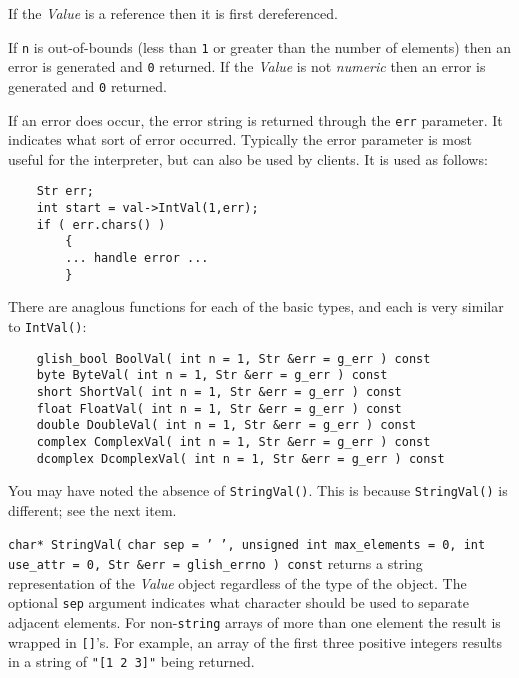 \begin{sloppy}
\begin{list}{}{}
If the {\em Value} is a reference then it is first dereferenced.

If {\tt n} is out-of-bounds
(less than {\tt 1} or greater than the number of elements) then an
error is generated and {\tt 0} returned. 
If the {\em Value} is
not {\em numeric} then an error is generated and {\tt 0} returned.

If an error does occur, the error string is returned through the {\tt err}
parameter. It indicates what sort of error occurred. Typically the error parameter
is most useful for the interpreter, but can also be used by
clients. It is  used as follows:
\begin{verbatim}
    Str err;
    int start = val->IntVal(1,err);
    if ( err.chars() )
        {
        ... handle error ...
        }
\end{verbatim}

There are anaglous functions for each of the basic types, and each
is very similar to {\tt IntVal()}:
\begin{verbatim}
    glish_bool BoolVal( int n = 1, Str &err = g_err ) const
    byte ByteVal( int n = 1, Str &err = g_err ) const
    short ShortVal( int n = 1, Str &err = g_err ) const
    float FloatVal( int n = 1, Str &err = g_err ) const
    double DoubleVal( int n = 1, Str &err = g_err ) const
    complex ComplexVal( int n = 1, Str &err = g_err ) const
    dcomplex DcomplexVal( int n = 1, Str &err = g_err ) const
\end{verbatim}
You may have noted the absence of {\tt StringVal()}. This is because
{\tt StringVal()} is different; see the next item.

\item[{\tt char* StringVal(}] {\tt char sep = ' ', unsigned int max\_elements = 0, 
int use\_attr = 0, Str \&err = glish\_errno ) const}
returns a string representation of the {\em Value} object regardless of
the type of the object.  The optional {\tt sep} argument indicates what character
should be used to separate adjacent elements. For non-{\tt string} arrays of more
than one element the result is wrapped in {\tt []}'s.  For example, an array of
the first three positive integers results in a string of {\tt "[1 2 3]"} being
returned.


\end{list}
\end{sloppy}
